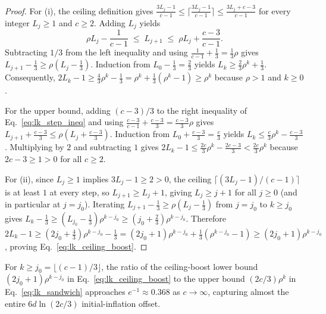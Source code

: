 \documentclass[11pt,a4paper]{article}
\theoremstyle{plain}
\theoremstyle{definition}
\theoremstyle{remark}
\begin{document}
\begin{proof}
For (i), the ceiling definition gives $\frac{3 L_j - 1}{c - 1} \le \lceil \frac{3 L_j - 1}{c - 1} \rceil \le \frac{3 L_j + c - 3}{c - 1}$ for every integer $L_j \ge 1$ and $c \ge 2$. Adding $L_j$ yields
\begin{equation}
    \rho L_j - \frac{1}{c - 1} \;\le\; L_{j+1} \;\le\; \rho L_j + \frac{c - 3}{c - 1} .
    \label{eq:lk_step_ineq}
\end{equation}
Subtracting $1/3$ from the left inequality and using $\frac{1}{c - 1} + \frac{1}{3} = \frac{1}{3}\rho$ gives $L_{j+1} - \frac{1}{3} \ge \rho(L_j - \frac{1}{3})$. Induction from $L_0 - \frac{1}{3} = \frac{2}{3}$ yields $L_k \ge \frac{2}{3}\rho^k + \frac{1}{3}$. Consequently, $2 L_k - 1 \ge \frac{4}{3}\rho^k - \frac{1}{3} = \rho^k + \frac{1}{3}(\rho^k - 1) \ge \rho^k$ because $\rho > 1$ and $k \ge 0$.

For the upper bound, adding $(c - 3)/3$ to the right inequality of Eq.~\eqref{eq:lk_step_ineq} and using $\frac{c - 3}{c - 1} + \frac{c - 3}{3} = \frac{c - 3}{3}\rho$ gives $L_{j+1} + \frac{c - 3}{3} \le \rho(L_j + \frac{c - 3}{3})$. Induction from $L_0 + \frac{c - 3}{3} = \frac{c}{3}$ yields $L_k \le \frac{c}{3}\rho^k - \frac{c - 3}{3}$. Multiplying by $2$ and subtracting $1$ gives $2 L_k - 1 \le \frac{2c}{3}\rho^k - \frac{2c - 3}{3} < \frac{2c}{3}\rho^k$ because $2c - 3 \ge 1 > 0$ for all $c \ge 2$.

For (ii), since $L_j \ge 1$ implies $3 L_j - 1 \ge 2 > 0$, the ceiling $\lceil (3 L_j - 1)/(c - 1) \rceil$ is at least $1$ at every step, so $L_{j+1} \ge L_j + 1$, giving $L_j \ge j + 1$ for all $j \ge 0$ (and in particular at $j = j_0$). Iterating $L_{j+1} - \frac{1}{3} \ge \rho(L_j - \frac{1}{3})$ from $j = j_0$ to $k \ge j_0$ gives $L_k - \frac{1}{3} \ge (L_{j_0} - \frac{1}{3})\rho^{k - j_0} \ge (j_0 + \frac{2}{3})\rho^{k - j_0}$. Therefore $2 L_k - 1 \ge (2 j_0 + \frac{4}{3})\rho^{k - j_0} - \frac{1}{3} = (2 j_0 + 1)\rho^{k - j_0} + \frac{1}{3}(\rho^{k - j_0} - 1) \ge (2 j_0 + 1)\rho^{k - j_0}$, proving Eq.~\eqref{eq:lk_ceiling_boost}.
\end{proof}

For $k \ge j_0 = \lfloor (c - 1)/3 \rfloor$, the ratio of the ceiling-boost lower bound $(2 j_0 + 1)\rho^{k - j_0}$ in Eq.~\eqref{eq:lk_ceiling_boost} to the upper bound $(2c/3)\rho^k$ in Eq.~\eqref{eq:lk_sandwich} approaches $e^{-1} \approx 0.368$ as $c \to \infty$, capturing almost the entire $6d\ln(2c/3)$ initial-inflation offset.

\end{document}
